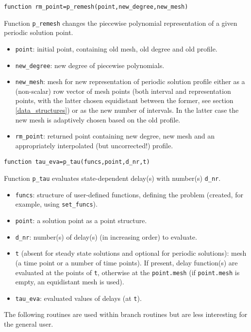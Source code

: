 \documentclass[10pt]{scrartcl}
\newcommand{\blist}[1]{\mbox{\lstinline!#1!}}
\begin{document}
{\begin{lstlisting}
function rm_point=p_remesh(point,new_degree,new_mesh)  
\end{lstlisting}
\noindent Function \blist{p_remesh} changes the piecewise polynomial
representation of a given periodic solution point.
\begin{itemize}
\item \blist{point}: initial point, containing old mesh, old degree
  and old profile.
\item \blist{new_degree}: new degree of piecewise polynomials.
\item \blist{new_mesh}: mesh for new representation of periodic
  solution profile either as a (non-scalar) row vector of mesh points
  (both interval and representation points, with the latter chosen
  equidistant between the former, see section \ref{data_structures})
  or as the new number of intervals.  In the latter case the new mesh
  is adaptively chosen based on the old profile.
\item \blist{rm_point}: returned point containing new degree, new mesh
  and an appropriately interpolated (but uncorrected!) profile.
\end{itemize} 
\begin{lstlisting}
function tau_eva=p_tau(funcs,point,d_nr,t)  
\end{lstlisting}
\noindent Function \blist{p_tau} evaluates state-dependent delay(s) 
with number(s) \blist{d_nr}. 
\begin{itemize}
\item \blist{funcs}: structure of user-defined functions, defining the
  problem (created, for example, using \blist{set_funcs}).
\item \blist{point}: a solution point as a point structure.
\item \blist{d_nr}: number(s) of delay(s) (in increasing order) 
to evaluate.
\item \blist{t} (absent for steady state solutions and optional for
  periodic solutions): mesh (a time point or a number of time
  points). If present, delay function(s) are evaluated at the points
  of \blist{t}, otherwise at the \blist{point.mesh} (if
  \blist{point.mesh} is empty, an equidistant mesh is used).
\item \blist{tau_eva}: evaluated values of delays (at \blist{t}). 
\end{itemize}
The following routines are used within branch routines but
are less interesting for the general user.

}
\end{document}
